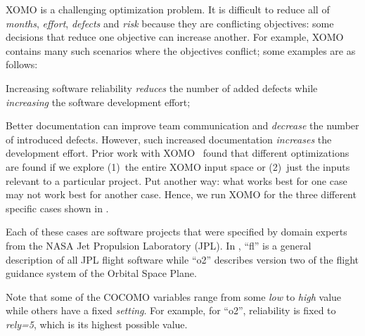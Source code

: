 XOMO is a challenging optimization problem.
It is difficult to reduce all of {\em months}, {\em effort}, {\em defects} and {\em risk} because they are conflicting objectives: 
some decisions that reduce one objective can increase another.
For example,
XOMO contains many such scenarios where the objectives conflict; some examples are as follows:
\bi
\item
Increasing
software reliability   {\em reduces} the
  number of added defects while {\em increasing} the 
software development effort;
\item 
Better documentation can improve team communication and {\em decrease} the number of introduced defects.
However, such increased documentation {\em increases} the development effort.
\ei
Prior work with XOMO~\cite{me09a} found that different optimizations are found if we explore (1)~the entire
XOMO input space or (2)~just the inputs relevant to a particular project. Put another way: what works best for one case may not work best for another case.
Hence, we run XOMO for the three different specific cases shown in .

Each of these cases are software projects that were specified by domain experts from the NASA Jet Propulsion Laboratory (JPL).   In , ``fl''
is a general description of all JPL flight software while ``o2''
describes version two of the flight guidance system
of the Orbital Space Plane.

Note that some of the COCOMO variables
range from some {\em low} to {\em high} value while others have a fixed {\em setting}.
For example, for ``o2'', reliability is fixed to {\em rely=5}, which is
its highest possible value.  
